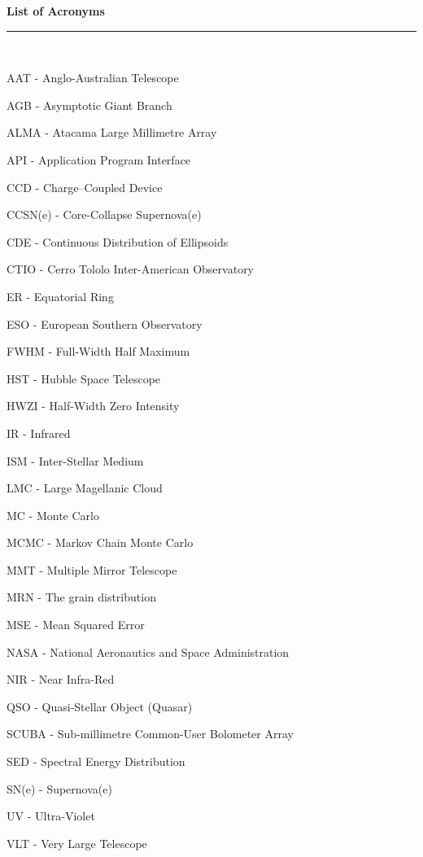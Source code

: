 \thispagestyle{empty}
\begin{raggedleft}
\vspace*{23mm}
\hfill {\huge {\bf {List of Acronyms}}} \\
\vspace{6mm}
\hfill \rule{4in}{.015in} \\
\vspace{19mm}
\end{raggedleft}




%
%

AAT - Anglo-Australian Telescope

AGB - Asymptotic Giant Branch

ALMA - Atacama Large Millimetre Array

API - Application Program Interface

CCD - Charge--Coupled Device

CCSN(e) - Core-Collapse Supernova(e)

CDE - Continuous Distribution of Ellipsoids

CTIO - Cerro Tololo Inter-American Observatory

ER - Equatorial Ring

ESO - European Southern Observatory

FWHM - Full-Width Half Maximum

HST - Hubble Space Telescope

HWZI - Half-Width Zero Intensity

IR - Infrared

ISM - Inter-Stellar Medium

LMC - Large Magellanic Cloud

MC - Monte Carlo

MCMC - Markov Chain Monte Carlo 

MMT - Multiple Mirror Telescope

MRN - The \citet*{Mathis1977} grain distribution

MSE - Mean Squared Error

NASA - National Aeronautics and Space Administration

NIR - Near Infra-Red

QSO - Quasi-Stellar Object (Quasar)

SCUBA - Sub-millimetre Common-User Bolometer Array

SED - Spectral Energy Distribution

SN(e) - Supernova(e)

UV - Ultra-Violet

VLT - Very Large Telescope
